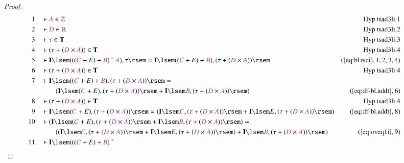 \begin{proof}
\begin{align}
  1 &&  & \vdash \mc{A} \in \mathbb{Z}&\text{Hyp~tsad3li.1}\notag%
  \\ 2 &&  & \vdash \mc{D} \in
      \mathbb{R}&\text{Hyp~tsad3li.2}\notag%
  \\ 3 &&  & \vdash \tau \in \mathbf{T}&\text{Hyp~tsad3li.3}\notag%
  \\ 4 &&  & \vdash ( \tau + ( \mc{D} \times \mc{A} ) ) \in
      \mathbf{T}&\text{Hyp~tsad3li.4}\notag%
  \\ 5 &&  & \vdash \mathbf{I} \lsem ( ( ( \mc{C} + E ) + \mc{B} ) ~\string^~
      \mc{A} ) , \tau \rsem = \mathbf{I} \lsem ( ( \mc{C} +
      E ) + \mc{B} ) , ( \tau + ( \mc{D} \times \mc{A} ) )
      \rsem&(\mbox{\ref{eq:bl.tsci}},1,2,3,4)\notag
  \\ 6 &&  & \vdash ( \tau + ( \mc{D} \times \mc{A} ) ) \in
      \mathbf{T}&\text{Hyp~tsad3li.4}\notag%
  \\ 7 &&  & \vdash \mathbf{I} \lsem ( ( \mc{C} + E ) + \mc{B} ) , ( \tau + (
      \mc{D} \times \mc{A} ) ) \rsem =  \notag \\ & & & \qquad
     ( \mathbf{I} \lsem (
      \mc{C} + E ) , ( \tau + ( \mc{D} \times \mc{A} ) )
      \rsem + \mathbf{I} \lsem \mc{B} , ( \tau + ( \mc{D}
      \times \mc{A} ) ) \rsem
      )&(\mbox{\ref{eq:df-bl.addt}},6)\notag
  \\ 8 &&  & \vdash ( \tau + ( \mc{D} \times \mc{A} ) ) \in
      \mathbf{T}&\text{Hyp~tsad3li.4}\notag%
  \\ 9 &&  & \vdash \mathbf{I} \lsem ( \mc{C} + E ) , ( \tau + ( \mc{D} \times
      \mc{A} ) ) \rsem = ( \mathbf{I} \lsem \mc{C} , ( \tau
      + ( \mc{D} \times \mc{A} ) ) \rsem + \mathbf{I} \lsem
      E , ( \tau + ( \mc{D} \times \mc{A} ) ) \rsem
      )&(\mbox{\ref{eq:df-bl.addt}},8)\notag
  \\ 10 &&  & \vdash ( \mathbf{I} \lsem ( \mc{C} + E ) , ( \tau + ( \mc{D}
      \times \mc{A} ) ) \rsem + \mathbf{I} \lsem \mc{B} , (
      \tau + ( \mc{D} \times \mc{A} ) ) \rsem ) =  \notag \\ & & & \qquad
     ( (
      \mathbf{I} \lsem \mc{C} , ( \tau + ( \mc{D} \times
      \mc{A} ) ) \rsem + \mathbf{I} \lsem E , ( \tau + (
      \mc{D} \times \mc{A} ) ) \rsem ) + \mathbf{I} \lsem
      \mc{B} , ( \tau + ( \mc{D} \times \mc{A} ) ) \rsem
      )&(\mbox{\ref{eq:oveq1i}},9)\notag
  \\ 11 &&  & \vdash \mathbf{I} \lsem ( ( ( \mc{C} + E ) + \mc{B} ) ~\string^~

\end{align}
\end{proof}
